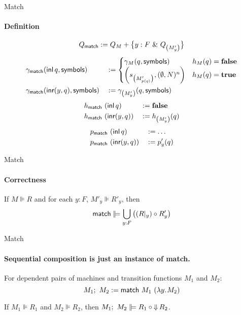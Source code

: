 \begin{frame}{Match}
  \framesubtitle{Definition}
  \footnotesize
  $$Q_{\textsf{match}} := Q_M + \bigl\{ y:F~{\&}~Q_{ \left( M'_{y} \right) } \bigr \}$$
  \begin{alignat*}{2}
    \gamma_{\textsf{match}} & (\operatorname{\textsf{inl}} q, \textsf{symbols}) &&:=
    \begin{cases}
      \gamma_{M}(q, \textsf{symbols})                                & h_M(q) = \mathbf{false} \\
      \left( s_{\left(M'_{p(q)}\right)}, (\emptyset, N)^n \right)  & h_M(q) = \mathbf{true}
    \end{cases} \\
    \gamma_{\textsf{match}} & (\operatorname{\textsf{inr}} (y, q), \textsf{symbols}) &&:= \gamma_{\left({M'_y}\right)}(q, \textsf{symbols})
  \end{alignat*}
  \begin{alignat*}{3}
    h_{\textsf{match}} &~ (\operatorname{\textsf{inl}}      q) &&:= \mathbf{false} \\
    h_{\textsf{match}} &~ (\operatorname{\textsf{inr}} (y, q)) &&:= h_{\left( M'_y \right)}(q)
  \end{alignat*}
  \begin{alignat*}{3}
    p_{\textsf{match}} &~ (\operatorname{\textsf{inl}}      q) &&:= \dots \\
    p_{\textsf{match}} &~ (\operatorname{\textsf{inr}} (y, q)) &&:= p'_y(q)
  \end{alignat*}
\end{frame}

\begin{frame}{Match}
  \framesubtitle{Correctness}
  \begin{lemma}
    If $M \VDash R$ and for each $y:F$, $M'_y \VDash R'_y$, then
    $$\MS{match} \VDash \bigcup_{y:F} \left( (R \at y) \circ R'_y \right)$$
  \end{lemma}
\end{frame}

\begin{frame}{Match}
  \framesubtitle{Sequential composition is just an instance of match.}
  \begin{definition}
    For dependent pairs of machines and transition functions $M_1$ and $M_2$:
    $$M_1 ;~ M_2 := \textsf{match}~M_1~(\lambda y{.}\hskip.7ptM_2)$$
  \end{definition}

  \begin{corollary}
    If $M_1 \VDash R_1$ and $M_2 \VDash R_2$, then $M_1 \mseq M_2 \VDash R_1 \circ \hideParam R_2$.
  \end{corollary}
\end{frame}

